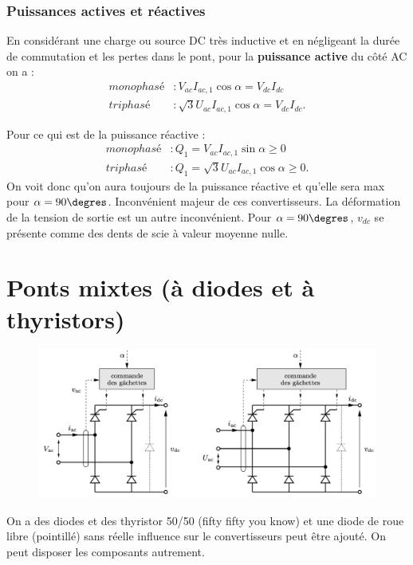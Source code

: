 					\subsubsection{Puissances actives et réactives}
						En considérant une charge ou source DC très inductive et en négligeant la durée de commutation et les pertes dans le pont, pour la \textbf{puissance active} du côté AC on a :
						\begin{equation}
						\begin{aligned}
						monophasé &: V_{ac}I_{ac,1}\cos \alpha = V_{dc}I_{dc}\\
						triphasé &: \sqrt{3}U_{ac}I_{ac,1}\cos \alpha = V_{dc}I_{dc}.
						\end{aligned}
						\end{equation}

						Pour ce qui est de la puissance réactive : 
						\begin{equation}
						\begin{aligned}
						monophasé &: Q_1 = V_{ac}I_{ac,1}\sin \alpha \geq 0\\
						triphasé &: Q_1 = \sqrt{3}U_{ac}I_{ac,1}\cos \alpha \geq 0.
						\end{aligned}
						\end{equation}
						On voit donc qu'on aura toujours de la puissance réactive et qu'elle sera max pour $\alpha = 90\degres$. Inconvénient majeur de ces convertisseurs. La déformation de la tension de sortie est un autre inconvénient. Pour $\alpha = 90\degres$, $v_{dc}$ se présente comme des dents de scie à valeur moyenne nulle. 
						
	\section{Ponts mixtes (à diodes et à thyristors)}
		\begin{figure}
		\vspace{-5mm}
		\includegraphics[scale=0.28]{ch3/10}
		\end{figure}
		On a des diodes et des thyristor 50/50 (fifty fifty you know) et une diode de roue libre (pointillé) sans réelle influence sur le convertisseurs peut être ajouté. On peut disposer les composants autrement. \\
		
